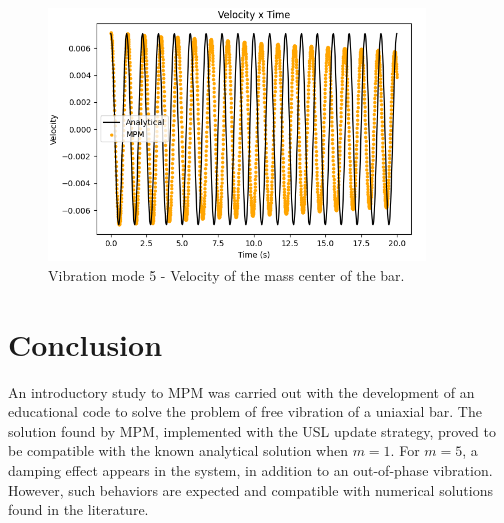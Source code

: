 \documentclass[preprint,12pt]{elsarticle}
\begin{document}
    \begin{figure}
    	\includegraphics[width=10cm]{exemplo_1_resultado_modo5.png}
    	\centering
    	\caption{Vibration mode 5 - Velocity of the mass center of the bar.}
    	\label{fig:result2}
    \end{figure}
    

	\section{Conclusion}
	An introductory study to MPM was carried out with the development of an educational code to solve the problem of free vibration of a uniaxial bar. The solution found by MPM, implemented with the USL update strategy, proved to be compatible with the known analytical solution when $m=1$. For $m=5$, a damping effect appears in the system, in addition to an out-of-phase vibration. However, such behaviors are expected and compatible with numerical solutions
    found in the literature.


	
	 
	
	
	
		

		
		
\end{document}
